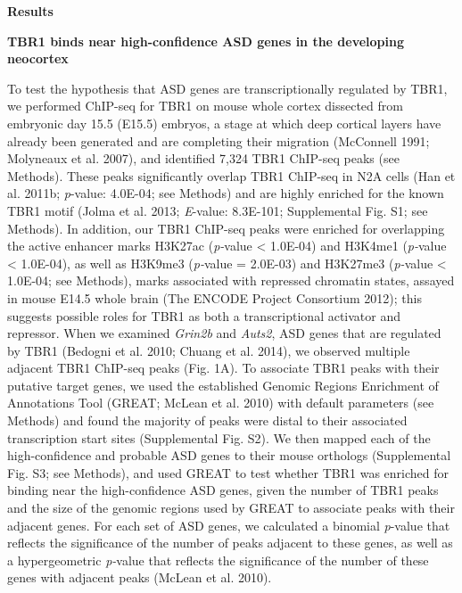 \documentclass[]{article}
\begin{document}
\textbf{Results}

\textbf{TBR1 binds near high-confidence ASD genes in the developing
neocortex}

To test the hypothesis that ASD genes are transcriptionally regulated by
TBR1, we performed ChIP-seq for TBR1 on mouse whole cortex dissected
from embryonic day 15.5 (E15.5) embryos, a stage at which deep cortical
layers have already been generated and are completing their migration
(McConnell 1991; Molyneaux et al. 2007), and identified 7,324 TBR1
ChIP-seq peaks (see Methods). These peaks significantly overlap TBR1
ChIP-seq in N2A cells (Han et al. 2011b; \emph{p}-value: 4.0E-04; see
Methods) and are highly enriched for the known TBR1 motif (Jolma et al.
2013; \emph{E}-value: 8.3E-101; Supplemental Fig. S1; see Methods). In
addition, our TBR1 ChIP-seq peaks were enriched for overlapping the
active enhancer marks H3K27ac (\emph{p-}value \textless{} 1.0E-04) and
H3K4me1 (\emph{p-}value \textless{} 1.0E-04), as well as H3K9me3
(\emph{p-}value = 2.0E-03) and H3K27me3 (\emph{p-}value \textless{}
1.0E-04; see Methods), marks associated with repressed chromatin states,
assayed in mouse E14.5 whole brain (The ENCODE Project Consortium 2012);
this suggests possible roles for TBR1 as both a transcriptional
activator and repressor. When we examined \emph{Grin2b} and
\emph{Auts2}, ASD genes that are regulated by TBR1 (Bedogni et al. 2010;
Chuang et al. 2014), we observed multiple adjacent TBR1 ChIP-seq peaks
(Fig. 1A). To associate TBR1 peaks with their putative target genes, we
used the established Genomic Regions Enrichment of Annotations Tool
(GREAT; McLean et al. 2010) with default parameters (see Methods) and
found the majority of peaks were distal to their associated
transcription start sites (Supplemental Fig. S2). We then mapped each of
the high-confidence and probable ASD genes to their mouse orthologs
(Supplemental Fig. S3; see Methods), and used GREAT to test whether TBR1
was enriched for binding near the high-confidence ASD genes, given the
number of TBR1 peaks and the size of the genomic regions used by GREAT
to associate peaks with their adjacent genes. For each set of ASD genes,
we calculated a binomial \emph{p}-value that reflects the significance
of the number of peaks adjacent to these genes, as well as a
hypergeometric \emph{p-}value that reflects the significance of the
number of these genes with adjacent peaks (McLean et al. 2010).
\end{document}
